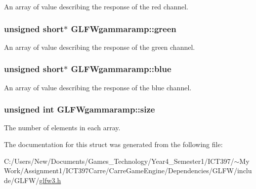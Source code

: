 An array of value describing the response of the red channel. \hypertarget{struct_g_l_f_wgammaramp_ffccc6f5df47820b6562d709da3a5a3a}{
\subsubsection[green]{\setlength{\rightskip}{0pt plus 5cm}unsigned short$\ast$ {\bf GLFWgammaramp::green}}}
\label{struct_g_l_f_wgammaramp_ffccc6f5df47820b6562d709da3a5a3a}


An array of value describing the response of the green channel. \hypertarget{struct_g_l_f_wgammaramp_cf0c836d0efe29c392fe8d1a1042744b}{
\subsubsection[blue]{\setlength{\rightskip}{0pt plus 5cm}unsigned short$\ast$ {\bf GLFWgammaramp::blue}}}
\label{struct_g_l_f_wgammaramp_cf0c836d0efe29c392fe8d1a1042744b}


An array of value describing the response of the blue channel. \hypertarget{struct_g_l_f_wgammaramp_d620e1cffbff9a32c51bca46301b59a5}{
\subsubsection[size]{\setlength{\rightskip}{0pt plus 5cm}unsigned int {\bf GLFWgammaramp::size}}}
\label{struct_g_l_f_wgammaramp_d620e1cffbff9a32c51bca46301b59a5}


The number of elements in each array. 

The documentation for this struct was generated from the following file:\begin{CompactItemize}
\item 
C:/Users/New/Documents/Games\_\-Technology/Year4\_\-Semester1/ICT397/$\sim$My Work/Assignment1/ICT397Carre/CarreGameEngine/Dependencies/GLFW/include/GLFW/\hyperlink{glfw3_8h}{glfw3.h}\end{CompactItemize}
